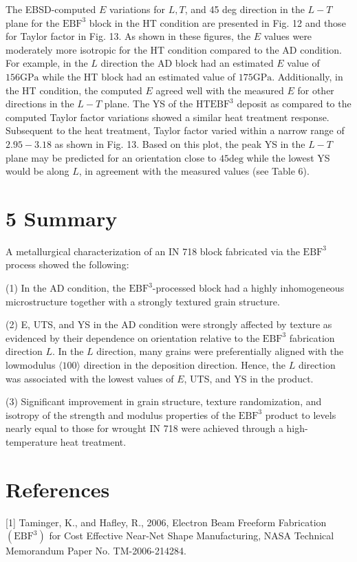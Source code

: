 \documentclass[10pt]{article}
\begin{document}
The EBSD-computed $E$ variations for $L, T$, and 45 deg direction in the $L-T$ plane for the $\mathrm{EBF}^{3}$ block in the HT condition are presented in Fig. 12 and those for Taylor factor in Fig. 13. As shown in these figures, the $E$ values were moderately more isotropic for the HT condition compared to the AD condition. For example, in the $L$ direction the $\mathrm{AD}$ block had an estimated $E$ value of $156 \mathrm{GPa}$ while the HT block had an estimated value of $175 \mathrm{GPa}$. Additionally, in the HT condition, the computed $E$ agreed well with the measured $E$ for other directions in the $L-T$ plane. The YS of the $\mathrm{HT} \mathrm{EBF}^{3}$ deposit as compared to the computed Taylor factor variations showed a similar heat treatment response. Subsequent to the heat treatment, Taylor factor varied within a narrow range of $2.95-3.18$ as shown in Fig. 13. Based on this plot, the peak YS in the $L-T$ plane may be predicted for an orientation close to $45 \mathrm{deg}$ while the lowest YS would be along $L$, in agreement with the measured values (see Table 6).

\section*{5 Summary}
A metallurgical characterization of an IN 718 block fabricated via the $\mathrm{EBF}^{3}$ process showed the following:

(1) In the $\mathrm{AD}$ condition, the $\mathrm{EBF}^{3}$-processed block had a highly inhomogeneous microstructure together with a strongly textured grain structure.

(2) E, UTS, and YS in the AD condition were strongly affected by texture as evidenced by their dependence on orientation relative to the $\mathrm{EBF}^{3}$ fabrication direction $L$. In the $L$ direction, many grains were preferentially aligned with the lowmodulus $\langle 100\rangle$ direction in the deposition direction. Hence, the $L$ direction was associated with the lowest values of $E$, UTS, and YS in the product.

(3) Significant improvement in grain structure, texture randomization, and isotropy of the strength and modulus properties of the $\mathrm{EBF}^{3}$ product to levels nearly equal to those for wrought IN 718 were achieved through a high-temperature heat treatment.

\section*{References}
[1] Taminger, K., and Hafley, R., 2006, Electron Beam Freeform Fabrication $\left(\mathrm{EBF}^{3}\right)$ for Cost Effective Near-Net Shape Manufacturing, NASA Technical Memorandum Paper No. TM-2006-214284.
\end{document}
